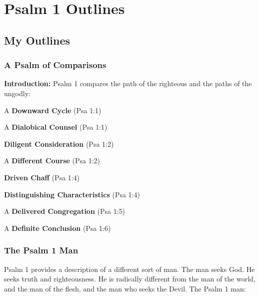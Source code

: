 \section{Psalm 1 Outlines}

\subsection{My Outlines}

\subsubsection{A Psalm of Comparisons}
\textbf{Introduction: }Psalm 1 compares the path of the righteous and the paths of the ungodly:
\begin{compactenum}[I.]
    \item A \textbf{Downward Cycle} (Psa 1:1)
    \item A \textbf{Dialobical Counsel} (Psa 1:1)
    \item \textbf{Diligent Consideration} (Psa 1:2)
    \item A \textbf{Different Course} (Psa 1:2)
    \item \textbf{Driven Chaff} (Psa 1:4)
    \item \textbf{Distinguishing Characteristics}  (Psa 1:4)
    \item A \textbf{Delivered Congregation} (Psa 1:5)
    \item A \textbf{Definite Conclusion} (Psa 1:6)
\end{compactenum}

\subsubsection{The Psalm 1 Man}
Psalm 1 provides a description of a different sort of man.  The man seeks God.  He seeks truth and righteousness.  He is radically different from the man of the world, and the man of the flesh, and the man who seeks the Devil. The Psalm 1 man: %


